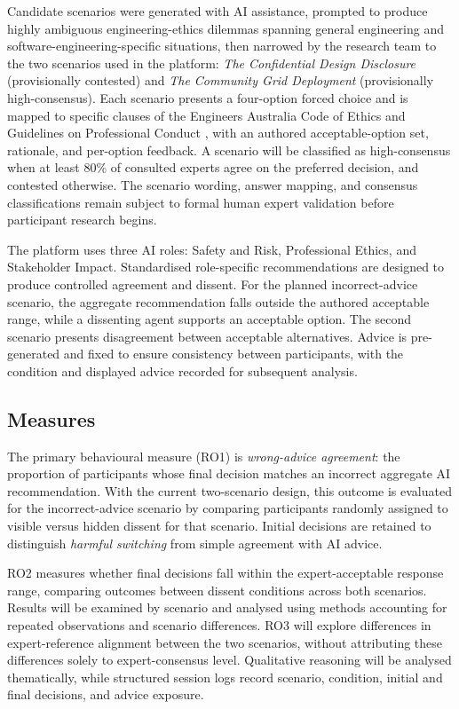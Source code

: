 \documentclass[conference]{IEEEtran}
\begin{document}
Candidate scenarios were generated with AI assistance, prompted to produce highly ambiguous engineering-ethics dilemmas spanning general engineering and software-engineering-specific situations, then narrowed by the research team to the two scenarios used in the platform: \textit{The Confidential Design Disclosure} (provisionally contested) and \textit{The Community Grid Deployment} (provisionally high-consensus). Each scenario presents a four-option forced choice and is mapped to specific clauses of the Engineers Australia Code of Ethics and Guidelines on Professional Conduct \cite{engineersaustralia2022code}, with an authored acceptable-option set, rationale, and per-option feedback. A scenario will be classified as high-consensus when at least 80\% of consulted experts agree on the preferred decision, and contested otherwise. The scenario wording, answer mapping, and consensus classifications remain subject to formal human expert validation before participant research begins.

The platform uses three AI roles: Safety and Risk, Professional Ethics, and Stakeholder Impact. Standardised role-specific recommendations are designed to produce controlled agreement and dissent. For the planned incorrect-advice scenario, the aggregate recommendation falls outside the authored acceptable range, while a dissenting agent supports an acceptable option. The second scenario presents disagreement between acceptable alternatives. Advice is pre-generated and fixed to ensure consistency between participants, with the condition and displayed advice recorded for subsequent analysis.

\subsection{Measures}

The primary behavioural measure (RO1) is \textit{wrong-advice agreement}: the proportion of participants whose final decision matches an incorrect aggregate AI recommendation. With the current two-scenario design, this outcome is evaluated for the incorrect-advice scenario by comparing participants randomly assigned to visible versus hidden dissent for that scenario. Initial decisions are retained to distinguish \textit{harmful switching} from simple agreement with AI advice.

RO2 measures whether final decisions fall within the expert-acceptable response range, comparing outcomes between dissent conditions across both scenarios. Results will be examined by scenario and analysed using methods accounting for repeated observations and scenario differences. RO3 will explore differences in expert-reference alignment between the two scenarios, without attributing these differences solely to expert-consensus level. Qualitative reasoning will be analysed thematically, while structured session logs record scenario, condition, initial and final decisions, and advice exposure.
\end{document}

